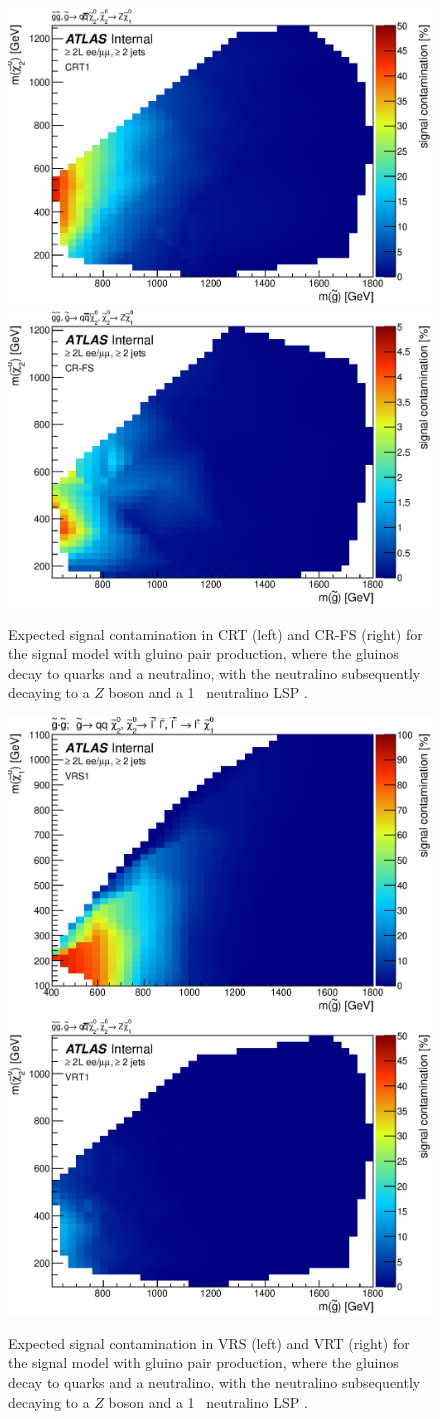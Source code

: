 \begin{figure}[ht]
\centering
\includegraphics[width=.48\textwidth]{figures/signalacceptcontam/cont_SM_GG_N2_1_CRT1.eps}
\includegraphics[width=.48\textwidth]{figures/signalacceptcontam/cont_SM_GG_N2_1_CR-FS.eps}
\caption{
Expected signal contamination in CRT (left) and CR-FS (right) for the signal model with gluino pair production, where the gluinos decay to quarks and a neutralino, 
with the neutralino subsequently decaying to a $Z$ boson and a 1 \gev~neutralino LSP \cite{this_paper}.}
\label{fig:sig_contam_CRT}
\end{figure}

\begin{figure}[ht]
\centering
\includegraphics[width=.48\textwidth]{figures/signalacceptcontam/cont_SM_GG_N2_1_VRS1.eps}
\includegraphics[width=.48\textwidth]{figures/signalacceptcontam/cont_SM_GG_N2_1_VRT1.eps}
\caption{
Expected signal contamination in VRS (left) and VRT (right) for the signal model with gluino pair production, where the gluinos decay to quarks and a neutralino, 
with the neutralino subsequently decaying to a $Z$ boson and a 1 \gev~neutralino LSP \cite{this_paper}.}
\label{fig:sig_contam_VR}
\end{figure}

